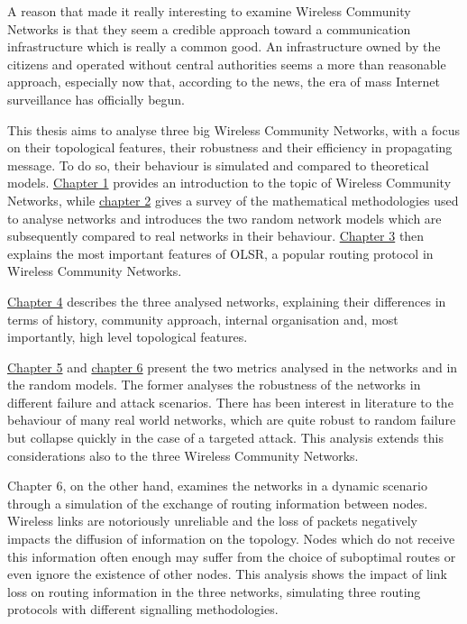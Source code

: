\documentclass[a4paper,11pt,twoside,openright]{memoir}
\begin{document}
A reason that made it really interesting to examine Wireless Community
Networks is that they seem a credible approach toward a communication
infrastructure which is really a common good. An infrastructure owned by the
citizens and operated without central authorities seems a more than reasonable
approach, especially now that, according to the news, the era of mass Internet
surveillance has officially begun.

This thesis aims to analyse three big Wireless Community Networks, with a
focus on their topological features, their robustness and their efficiency
in propagating message. To do so, their behaviour is simulated and
compared to theoretical models.
\hyperref[wireless-community-networks]{Chapter 1} provides an introduction to
the topic of Wireless Community Networks, while
\hyperref[network-topology-and-graphs]{chapter 2} gives a survey of the
mathematical methodologies used to analyse networks
and introduces the two random network models which are subsequently
compared to real networks in their behaviour.
\hyperref[olsr-survey]{Chapter 3} then explains the most important 
features of OLSR, a popular routing protocol in Wireless Community Networks.

\hyperref[the-networks]{Chapter 4} describes the three analysed networks,
explaining their differences in terms
of history, community approach, internal organisation and, most importantly,
high level topological features.

\hyperref[robustness-analysis]{Chapter 5} and
\hyperref[message-propagation-analysis]{chapter 6} present the two metrics
analysed in the networks and in the random models.
The former analyses the robustness of the networks in different failure and
attack scenarios. There has been interest in literature to the behaviour
of many real world networks, which are quite robust to random failure but
collapse quickly in the case of a targeted attack. This analysis
extends this considerations also to the three Wireless Community Networks.

Chapter 6, on the other hand, examines the networks in a dynamic scenario
through a simulation of the exchange of routing information between nodes.
Wireless links are notoriously unreliable and the loss of packets negatively
impacts the diffusion of information on the topology.
Nodes which do not receive this information often enough may suffer from the
choice of suboptimal routes or even ignore the existence of other nodes.
This analysis shows the impact of link loss on routing information
in the three networks, simulating three routing protocols with different
signalling methodologies.
\end{document}
